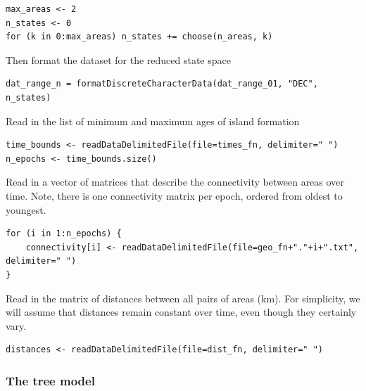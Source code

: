\begin{snugshade}
\begin{lstlisting}
max_areas <- 2
n_states <- 0
for (k in 0:max_areas) n_states += choose(n_areas, k)
\end{lstlisting}
\end{snugshade}

Then format the dataset for the reduced state space

\begin{snugshade}
\begin{lstlisting}
dat_range_n = formatDiscreteCharacterData(dat_range_01, "DEC", n_states)
\end{lstlisting}
\end{snugshade}



Read in the list of minimum and maximum ages of island formation

\begin{snugshade}
\begin{lstlisting}
time_bounds <- readDataDelimitedFile(file=times_fn, delimiter=" ")
n_epochs <- time_bounds.size()
\end{lstlisting}
\end{snugshade}

Read in a vector of matrices that describe the connectivity between areas over time.
Note, there is one connectivity matrix per epoch, ordered from oldest to youngest.

\begin{snugshade}
\begin{lstlisting}
for (i in 1:n_epochs) {
    connectivity[i] <- readDataDelimitedFile(file=geo_fn+"."+i+".txt", delimiter=" ")
}
\end{lstlisting}
\end{snugshade}

Read in the matrix of distances between all pairs of areas (km). For simplicity, we will assume that distances remain constant over time, even though they certainly vary.

\begin{snugshade}
\begin{lstlisting}
distances <- readDataDelimitedFile(file=dist_fn, delimiter=" ")
\end{lstlisting}
\end{snugshade}

\subsubsection{The tree model}


